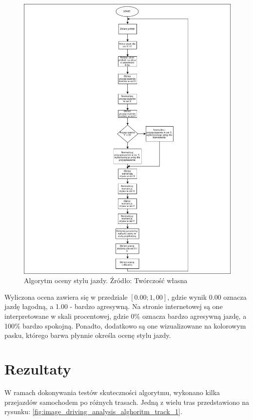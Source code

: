 \begin{figure}[H]
	\centering
	\includegraphics[width=15cm]{img/driving_analysis/driving_analysis.png}
	\caption{Algorytm oceny stylu jazdy. Źródło: Twórczość własna}
	\label{fig:image_driving_analysis_alghoritm}
\end{figure}

Wyliczona ocena zawiera się w przedziale $[0.00; 1,00]$, gdzie wynik 0.00 oznacza jazdę łagodną, a 1.00 - bardzo agresywną. Na stronie internetowej są one interpretowane w skali procentowej, gdzie 0\% oznacza bardzo agresywną jazdę, a 100\% bardzo spokojną. Ponadto, dodatkowo są one wizualizowane na kolorowym pasku, którego barwa płynnie określa ocenę stylu jazdy.


\section{Rezultaty}

W ramach dokonywania testów skuteczności algorytmu, wykonano kilka przejazdów samochodem po różnych trasach. Jedną z wielu tras przedstawiono na rysunku: \ref{fig:image_driving_analysis_alghoritm_track_1}.

